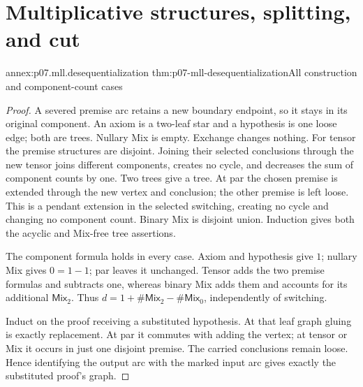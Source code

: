 \section{Multiplicative structures, splitting, and cut}

\begin{annexitem}{annex:p07.mll.desequentialization}
 {thm:p07-mll-desequentialization}{All construction and component-count cases}
\begin{proof}
A severed premise arc retains a new boundary endpoint, so it stays in its
original component. An axiom is a two-leaf star and a hypothesis is one
loose edge; both are trees. Nullary Mix is empty. Exchange changes nothing.
For tensor the premise structures are disjoint. Joining their selected
conclusions through the new tensor joins different components, creates
no cycle, and decreases the sum of component counts by one. Two trees
give a tree. At par the chosen premise is extended through the new
vertex and conclusion; the other premise is left loose. This is a
pendant extension in the selected switching, creating no cycle and
changing no component count. Binary Mix is disjoint union.
Induction gives both the acyclic and Mix-free tree assertions.

The component formula holds in every case. Axiom and hypothesis give
\(1\); nullary Mix gives \(0=1-1\); par leaves it unchanged.
Tensor adds the two premise formulas and subtracts one, whereas binary
Mix adds them and accounts for its additional \(\mathsf{Mix}_2\).
Thus \(d=1+\#\mathsf{Mix}_2-\#\mathsf{Mix}_0\), independently of switching.

Induct on the proof receiving a substituted hypothesis. At that leaf
graph gluing is exactly replacement. At par it commutes with adding
the vertex; at tensor or Mix it occurs in just one disjoint premise.
The carried conclusions remain loose. Hence identifying the output
arc with the marked input arc gives exactly the substituted proof's graph.
\end{proof}
\end{annexitem}

